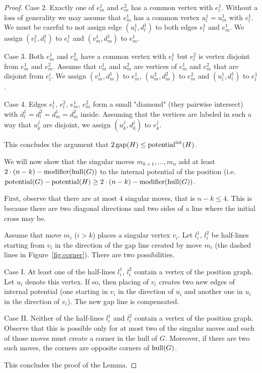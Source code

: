 \begin{proof}
Case 2. Exactly one of $e^1_m$ and $e^2_m$ has a common vertex with $e^1_l$. Without a loss of generality we may assume that $e^1_m$ has a common vertex $u^1_l = u^1_m$ with $e^1_l$.
We must be careful to not assign edge $(u^1_l, d^1_l)$ to both edges $e^1_l$ and $e^1_m$.
We assign $(v^1_l, d^1_l)$ to $e^1_l$ and
  $(v^1_m, d^1_m)$ to $e^1_m$.

Case 3. Both $e^1_m$ and $e^2_m$ have a common vertex with $e^1_l$ but $e^2_l$ is vertex disjoint from $e^1_m$ and $e^2_m$. Assume that $v^1_m$ and $u^2_m$ are vertices of $e^1_m$ and $e^2_m$ that are disjoint from $e^i_l$. 
We assign $(v^1_m, d^1_m)$ to $e^1_m$, $(u^2_m, d^2_m)$ to $e^2_m$ and $(u^1_l, d^1_l)$ to $e^1_l$.

Case 4. Edges $e^1_l$, $e^2_l$, $e^1_m$, $e^2_m$ form a small "diamond" (they pairwise intersect) with $d^1_l = d^2_l = d^1_m = d^2_m$ inside. Assuming that the vertices are labeled in such a way that $u^j_k$ are disjoint, we assign $(u^j_k, d^j_k)$ to $e^j_k$.

\noindent
This concludes the argument that
$
2\operatorname{gap}(H) \leq \operatorname{potential}^{\operatorname{int}}(H)$.


\noindent


We will now show that the singular moves $m_{k+1}, \ldots, m_n$ add at least $2 \cdot(n -k) - \operatorname{modifier}(\operatorname{hull}(G))$ to the internal potential of the position (i.e. $\operatorname{potential}(G) - \operatorname{potential}(H) \geq 2 \cdot(n -k) - \operatorname{modifier}(\operatorname{hull}(G))$.

First, observe that there are at most $4$ singular moves, that is $n - k \leq 4$. This is because there are two diagonal directions and two sides of a line where the initial cross may be.

Assume that move $m_i$ ($i > k$) places a singular vertex $v_i$. 
Let $l^1_i$, $l^2_i$ be half-lines starting from $v_i$ in the direction of the gap line created by move $m_i$ (the dashed lines in Figure~\ref{fig:corner}).
There are two possibilities.

Case I. At least one of the half-lines $l^1_i$, $l^2_i$ contain a vertex of the position graph. Let $u_i$ denote this vertex. If so, then placing of $v_i$ creates two new edges of internal potential (one starting in $v_i$ in the direction of $u_i$ and another one in $u_i$ in the direction of $v_i$). The new gap line is compensated.

Case II. Neither of the half-lines $l^1_i$ and $l^2_i$ contain a vertex of the position graph. Observe that this is possible only for at most two of the singular moves and each of those moves must create a corner in the hull of $G$. Moreover, if there are two such moves, the corners are opposite corners of $\operatorname{hull}(G)$.

\noindent
This concludes the proof of the Lemma.


\end{proof}